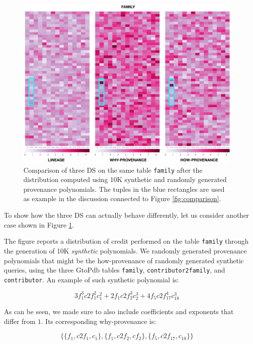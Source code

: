 \begin{figure}[tb]
  \includegraphics[width=1\textwidth]{figures/synthetic_polynomials}
  \caption{Comparison of three DS on the same table \texttt{family} after the distribution computed using 10K synthetic and randomly generated provenance polynomials. The tuples in the blue rectangles are used as example in the discussion connected to Figure \ref{fig:comparison}.}
  \label{figure:comparison_on_synthetic_polynomials_2}
\end{figure}

To show how the three DS can actually behave differently, let us consider another case shown in Figure \ref{figure:comparison_on_synthetic_polynomials_2}. 


The figure reports a distribution of credit performed on the table \texttt{family} through the generation of 10K \emph{synthetic} polynomials. 
We randomly generated provenance polynomials that might be the how-provenance of randomly generated synthetic queries, using the three GtoPdb tables \texttt{family}, \texttt{contributor2family}, and \texttt{contributor}. 
An example of such synthetic polynomial is:

{\footnotesize
\[
3 f_1^3 c2f_1^2 c_1^2 + 2 f_1 c2f_2^3 c_2^3 + 4 f_5 c2f_{17}^4 c_{18}^3
\] }

As can be seen, we made sure to also include coefficients and exponents that differ from $1$.
Its corresponding why-provenance is: 

{\footnotesize
\[
\{ \{f_1, c2f_1, c_1\}, \{f_1, c2f_2, cf_2\}, \{ f_5, c2f_{17}, c_{18}\} \}
\] 
}

